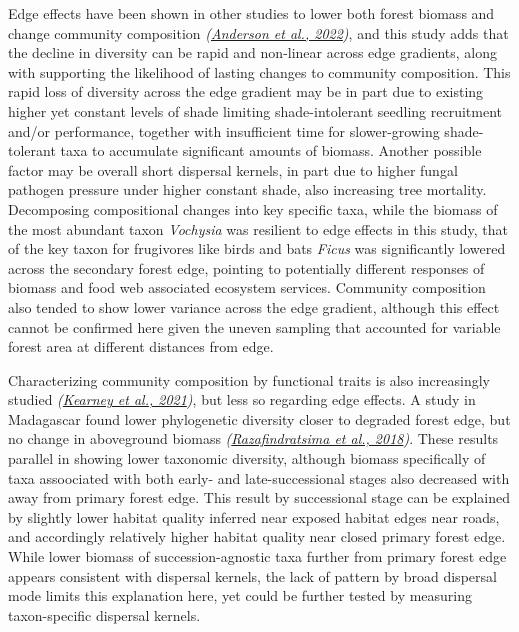 \documentclass[
  12pt,
]{article}
\begin{document}
Edge effects have been shown in other studies to lower both forest biomass and change community composition \emph{(\protect\hyperlink{ref-anderson22}{Anderson et al., 2022})}, and this study adds that the decline in diversity can be rapid and non-linear across edge gradients, along with supporting the likelihood of lasting changes to community composition.
This rapid loss of diversity across the edge gradient may be in part due to existing higher yet constant levels of shade limiting shade-intolerant seedling recruitment and/or performance, together with insufficient time for slower-growing shade-tolerant taxa to accumulate significant amounts of biomass.
Another possible factor may be overall short dispersal kernels, in part due to higher fungal pathogen pressure under higher constant shade, also increasing tree mortality.
Decomposing compositional changes into key specific taxa, while the biomass of the most abundant taxon \emph{Vochysia} was resilient to edge effects in this study, that of the key taxon for frugivores like birds and bats \emph{Ficus} was significantly lowered across the secondary forest edge, pointing to potentially different responses of biomass and food web associated ecosystem services.
Community composition also tended to show lower variance across the edge gradient, although this effect cannot be confirmed here given the uneven sampling that accounted for variable forest area at different distances from edge.

Characterizing community composition by functional traits is also increasingly studied \emph{(\protect\hyperlink{ref-kearney21}{Kearney et al., 2021})}, but less so regarding edge effects.
A study in Madagascar found lower phylogenetic diversity closer to degraded forest edge, but no change in aboveground biomass \emph{(\protect\hyperlink{ref-razafindratsima18}{Razafindratsima et al., 2018})}.
These results parallel in showing lower taxonomic diversity, although biomass specifically of taxa assoociated with both early- and late-successional stages also decreased with away from primary forest edge.
This result by successional stage can be explained by slightly lower habitat quality inferred near exposed habitat edges near roads, and accordingly relatively higher habitat quality near closed primary forest edge.
While lower biomass of succession-agnostic taxa further from primary forest edge appears consistent with dispersal kernels, the lack of pattern by broad dispersal mode limits this explanation here, yet could be further tested by measuring taxon-specific dispersal kernels.
\end{document}

